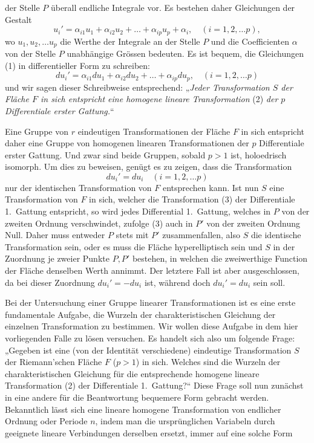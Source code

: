 \documentclass{article}
\begin{document}
der Stelle $P$ überall endliche Integrale vor. Es bestehen daher Gleichungen der Gestalt
\[
u_i' = \alpha_{i1} u_1 + \alpha_{i2} u_2 + \dots + \alpha_{ip} u_p + \alpha_i, \quad (i = 1, 2, \dots p),
\tag{1}
\]
wo $u_1, u_2, \dots u_p$ die Werthe der Integrale an der Stelle $P$ und die Coefficienten $\alpha$ von der Stelle $P$ unabhängige Grössen bedeuten. Es ist bequem, die Gleichungen (1) in differentieller Form zu schreiben:
\[
du_i' = \alpha_{i1} du_1 + \alpha_{i2} du_2 + \dots + \alpha_{ip} du_p, \quad (i = 1, 2, \dots p)
\tag{2}
\]
und wir sagen dieser Schreibweise entsprechend:
„\emph{Jeder Transformation $S$ der Fläche $F$ in sich entspricht eine homogene lineare Transformation} (2) \emph{der $p$ Differentiale erster Gattung.}“

Eine Gruppe von $r$ eindeutigen Transformationen der Fläche $F$ in sich entspricht daher eine Gruppe von homogenen linearen Transformationen der $p$ Differentiale erster Gattung. Und zwar sind beide Gruppen, sobald $p > 1$ ist, holoedrisch isomorph. Um dies zu beweisen, genügt es zu zeigen, dass die Transformation
\[
du_i' = du_i \quad (i = 1, 2, \dots p)
\tag{3}
\]
nur der identischen Transformation von $F$ entsprechen kann. Ist nun $S$ eine Transformation von $F$ in sich, welcher die Transformation (3) der Differentiale 1.~Gattung entspricht, so wird jedes Differential 1.~Gattung, welches in $P$ von der zweiten Ordnung verschwindet, zufolge (3) auch in $P'$ von der zweiten Ordnung Null. Daher muss entweder $P$ stets mit $P'$ zusammenfallen, also $S$ die identische Transformation sein, oder es muss die Fläche hyperelliptisch sein und $S$ in der Zuordnung je zweier Punkte $P, P'$ bestehen, in welchen die zweiwerthige Function der Fläche denselben Werth annimmt. Der letztere Fall ist aber ausgeschlossen, da bei dieser Zuordnung $du_i' = - du_i$ ist, während doch $du_i' = du_i$ sein soll.

Bei der Untersuchung einer Gruppe linearer Transformationen ist es eine erste fundamentale Aufgabe, die Wurzeln der charakteristischen Gleichung der einzelnen Transformation zu bestimmen. Wir wollen diese Aufgabe in dem hier vorliegenden Falle zu lösen versuchen. Es handelt sich also um folgende Frage:
„Gegeben ist eine (von der Identität verschiedene) eindeutige Transformation $S$ der Riemann'schen Fläche $F$ ($p > 1$) in sich. Welches sind die Wurzeln der charakteristischen Gleichung für die entsprechende homogene lineare Transformation (2) der Differentiale 1.~Gattung?“ Diese Frage soll nun zunächst in eine andere für die Beantwortung bequemere Form gebracht werden. Bekanntlich lässt sich eine lineare homogene Transformation von endlicher Ordnung oder Periode $n$, indem man die ursprünglichen Variabeln durch geeignete lineare Verbindungen derselben ersetzt, immer auf eine solche Form
\end{document}
